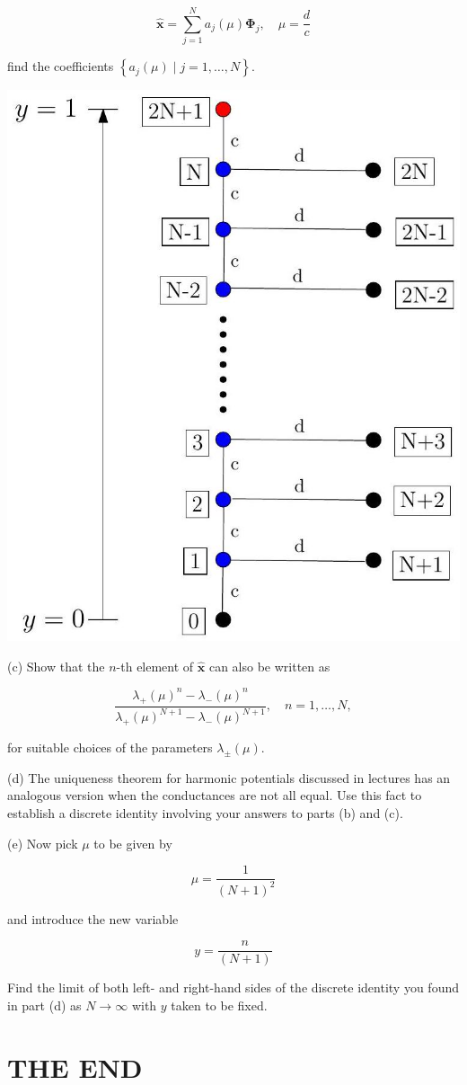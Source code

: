 \documentclass[10pt]{article}
\begin{document}
$$
\hat{\mathbf{x}}=\sum_{j=1}^{N} a_{j}(\mu) \boldsymbol{\Phi}_{j}, \quad \mu=\frac{d}{c}
$$

find the coefficients $\left\{a_{j}(\mu) \mid j=1, \ldots, N\right\}$.

\begin{center}
\includegraphics[max width=\textwidth]{2023_03_08_5758588d6e703b32009fg-2}
\end{center}

(c) Show that the $n$-th element of $\hat{\mathbf{x}}$ can also be written as

$$
\frac{\lambda_{+}(\mu)^{n}-\lambda_{-}(\mu)^{n}}{\lambda_{+}(\mu)^{N+1}-\lambda_{-}(\mu)^{N+1}}, \quad n=1, \ldots, N,
$$

for suitable choices of the parameters $\lambda_{ \pm}(\mu)$.

(d) The uniqueness theorem for harmonic potentials discussed in lectures has an analogous version when the conductances are not all equal. Use this fact to establish a discrete identity involving your answers to parts (b) and (c).

(e) Now pick $\mu$ to be given by

$$
\mu=\frac{1}{(N+1)^{2}}
$$

and introduce the new variable

$$
y=\frac{n}{(N+1)}
$$

Find the limit of both left- and right-hand sides of the discrete identity you found in part (d) as $N \rightarrow \infty$ with $y$ taken to be fixed.

\section{THE END}
\end{document}
